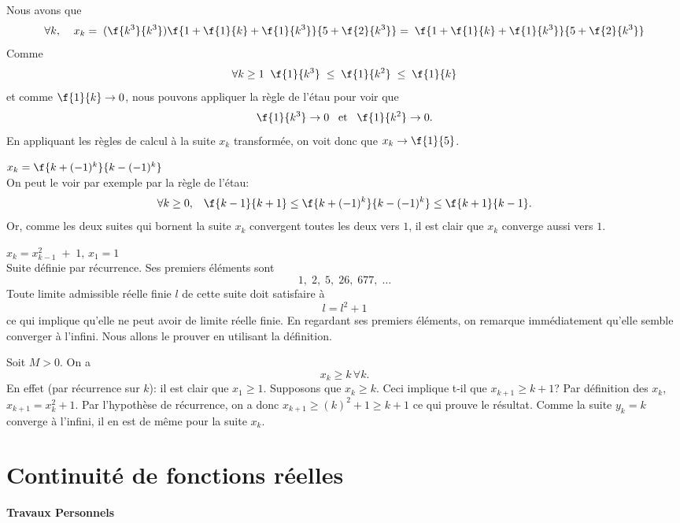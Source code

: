 \noindent Nous avons que \[\forall k, \;\;\;\;x_k =\; (\f{k^3}{k^3})\f{1+\f{1}{k} +\f{1}{k^3}}{5+\f{2}{k^3}}=\;\f{1+\f{1}{k} +\f{1}{k^3}}{5+\f{2}{k^3}} \]
Comme \[\forall k \geq 1\;\; \f{1}{k^3} \; \leq \;\f{1}{k^2}\; \leq \; \f{1}{k}\] et comme $\f{1}{k}\rightarrow 0$, nous pouvons appliquer la règle de l'étau pour voir que \[\f{1}{k^3} \rightarrow 0 \; \; \; {\rm et } \;\; \;\f{1}{k^2} \rightarrow 0.\]
En appliquant les règles de calcul à la suite $x_k$ transformée, on voit donc que $x_k \rightarrow  \f{1}{5}$.

\vspace{0.5cm}
 $x_k = \f{k+(-1)^k}{k-(-1)^k}$\\

\noindent On peut le voir par exemple par la règle de l'étau:
\[\forall k \geq 0, \;\;\; \f{k-1}{k+1} \leq \f{k+(-1)^k}{k-(-1)^k} \leq \f{k+1}{k-1}. \]
Or, comme les deux suites qui bornent la suite $x_k$ convergent toutes les deux vers $1$, il est clair que $x_k$ converge aussi vers $1$.


\vspace{0.5cm}
 $x_k = x_{k-1}^2\;+\;1,\, x_1=1$\\

\noindent Suite définie par récurrence. Ses premiers éléments sont \[1, \; 2, \; 5, \;  26, \; 677, \; \ldots\]
Toute  limite admissible réelle finie $l$  de cette suite doit satisfaire à \[l=l^2+1\] ce qui implique qu'elle ne peut avoir de limite réelle finie. En regardant ses premiers éléments, on remarque immédiatement qu'elle semble converger à l'infini. Nous allons le prouver en utilisant la définition.

\noindent Soit $M> 0$. On a \[x_k \geq k \, \forall k.\] En effet (par récurrence sur $k$): il est clair que $x_1 \geq 1$. Supposons que $x_k \geq k$. Ceci implique t-il que $x_{k+1}\geq k+1$? Par définition des $x_k$, $x_{k+1} = x_k^2+1$. Par l'hypothèse de récurrence, on a donc $x_{k+1}\geq (k)^2 +1\geq k+1$ ce qui prouve le résultat. Comme la suite $y_k=k$ converge à l'infini, il en est de même pour la suite $x_k$.



\section{Continuité de fonctions réelles}


\begin{center}
	\LARGE \bf
	Travaux Personnels
\end{center}


